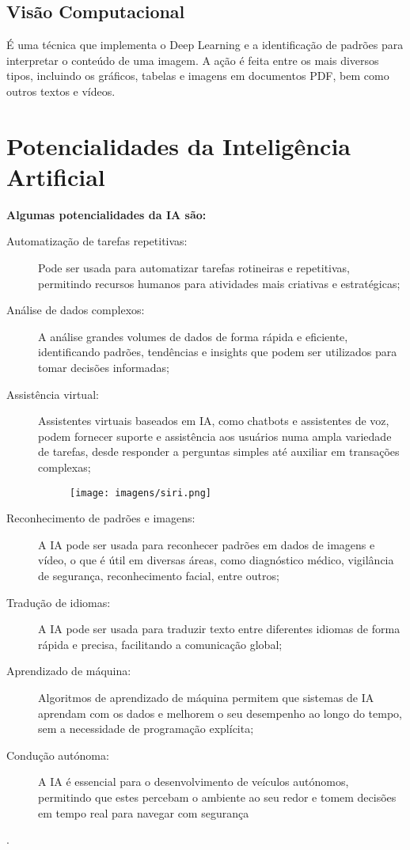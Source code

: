 \documentclass{report}
\begin{document}
\section{Visão Computacional}
É uma técnica que implementa o Deep Learning e a identificação de padrões para interpretar o conteúdo de uma imagem. A ação é feita entre os mais diversos tipos, incluindo os gráficos, tabelas e imagens em documentos PDF, bem como outros textos e vídeos.


\chapter{Potencialidades da Inteligência Artificial}
\label{chap.potência}
\vspace{25pt}
\Large\textbf{Algumas potencialidades da \ac{IA} são:}\normalsize
\begin{description}
    \item[Automatização de tarefas repetitivas:]  Pode ser usada para automatizar tarefas rotineiras e repetitivas, permitindo recursos humanos para atividades mais criativas e estratégicas;
    \item[Análise de dados complexos:] A análise grandes volumes de dados de forma rápida e eficiente, identificando padrões, tendências e insights que podem ser utilizados para tomar decisões informadas;
    \item[Assistência virtual:] Assistentes virtuais baseados em \ac{IA}, como chatbots e assistentes de voz, podem fornecer suporte e assistência aos usuários numa ampla variedade de tarefas, desde responder a perguntas simples até auxiliar em transações complexas;

    \begin{figure}
        \centering
        \texttt{[image: imagens/siri.png]}
        \caption{}
        \label{fig:siri}
    \end{figure}
        
    \clearpage
    
    \item[Reconhecimento de padrões e imagens:] A \ac{IA} pode ser usada para reconhecer padrões em dados de imagens e vídeo, o que é útil em diversas áreas, como diagnóstico médico, vigilância de segurança, reconhecimento facial, entre outros;
    \item[Tradução de idiomas:] A IA pode ser usada para traduzir texto entre diferentes idiomas de forma rápida e precisa, facilitando a comunicação global;
    \item[Aprendizado de máquina:] Algoritmos de aprendizado de máquina permitem que sistemas de \ac{IA} aprendam com os dados e melhorem o seu desempenho ao longo do tempo, sem a necessidade de programação explícita;
    \item[Condução autónoma:] A \ac{IA} é essencial para o desenvolvimento de veículos autónomos, permitindo que estes percebam o ambiente ao seu redor e tomem decisões em tempo real para navegar com segurança
\end{description}.
\end{document}
